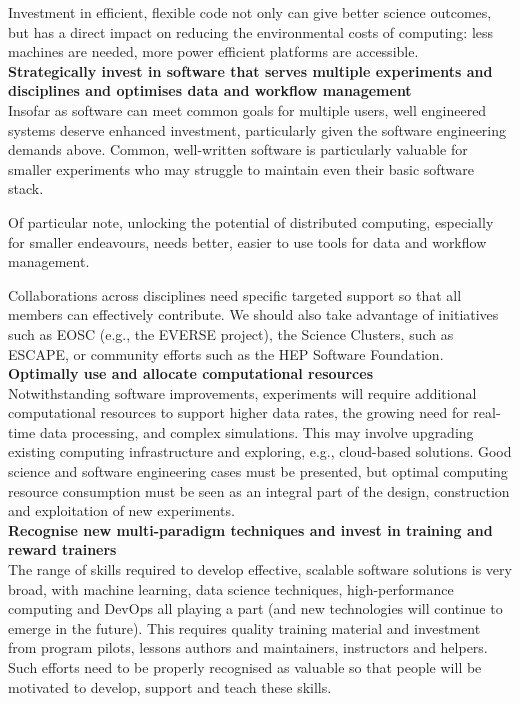 Investment in efficient, flexible code not only can give better science outcomes, but has a direct impact on reducing the environmental costs of computing: less machines are needed, more power efficient platforms are accessible.
\\

{\bf Strategically invest in software that serves multiple experiments and disciplines and optimises data and workflow management}\\

Insofar as software can meet common goals for multiple users, well engineered systems deserve enhanced investment, particularly given the software engineering demands above. Common, well-written software is particularly valuable for smaller experiments who may struggle to maintain even their basic software stack.

Of particular note, unlocking the potential of distributed computing, especially for smaller endeavours, needs better, easier to use tools for data and workflow management.

Collaborations across disciplines need specific targeted support so that all members can effectively contribute. We should also take advantage of initiatives such as EOSC (e.g., the EVERSE project), the Science Clusters, such as ESCAPE, or community efforts such as the HEP Software Foundation.
\\

{\bf Optimally use and allocate computational resources}\\

Notwithstanding software improvements, experiments will require additional computational resources to support higher data rates, the growing need for real-time data processing, and complex simulations. This may involve upgrading existing computing infrastructure and exploring, e.g., cloud-based solutions. Good science and software engineering cases must be presented, but optimal computing resource consumption must be seen as an integral part of the design, construction and exploitation of new experiments.
\\

{\bf Recognise new multi-paradigm techniques and invest in training and reward trainers}\\

The range of skills required to develop effective, scalable software solutions is very broad, with machine learning, data science techniques, high-performance computing and DevOps all playing a part (and new technologies will continue to emerge in the future). This requires quality training material and investment from program pilots, lessons authors and maintainers, instructors and helpers. Such efforts need to be properly recognised as valuable so that people will be motivated to develop, support and teach these skills.
\\

